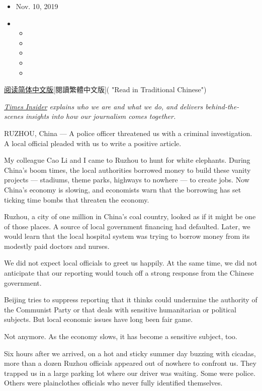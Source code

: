\begin{itemize}
\item
  Nov. 10, 2019
\item
  \begin{itemize}
  \item
  \item
  \item
  \item
  \item
  \end{itemize}
\end{itemize}

\href{https://cn.nytimes.com/business/20191111/china-reporter-police/}{阅读简体中文版}{[}閱讀繁體中文版{]}(
"Read in Traditional Chinese")

\href{https://www.nytimes.com/series/times-insider}{\emph{Times
Insider}} \emph{explains who we are and what we do, and delivers
behind-the-scenes insights into how our journalism comes together.}

RUZHOU, China --- A police officer threatened us with a criminal
investigation. A local official pleaded with us to write a positive
article.

My colleague Cao Li and I came to Ruzhou to hunt for white elephants.
During China's boom times, the local authorities borrowed money to build
these vanity projects --- stadiums, theme parks, highways to nowhere ---
to create jobs. Now China's economy is slowing, and economists warn that
the borrowing has set ticking time bombs that threaten the economy.

Ruzhou, a city of one million in China's coal country, looked as if it
might be one of those places. A source of local government financing had
defaulted. Later, we would learn that the local hospital system was
trying to borrow money from its modestly paid doctors and nurses.

We did not expect local officials to greet us happily. At the same time,
we did not anticipate that our reporting would touch off a strong
response from the Chinese government.

Beijing tries to suppress reporting that it thinks could undermine the
authority of the Communist Party or that deals with sensitive
humanitarian or political subjects. But local economic issues have long
been fair game.

Not anymore. As the economy slows, it has become a sensitive subject,
too.

Six hours after we arrived, on a hot and sticky summer day buzzing with
cicadas, more than a dozen Ruzhou officials appeared out of nowhere to
confront us. They trapped us in a large parking lot where our driver was
waiting. Some were police. Others were plainclothes officials who never
fully identified themselves.

